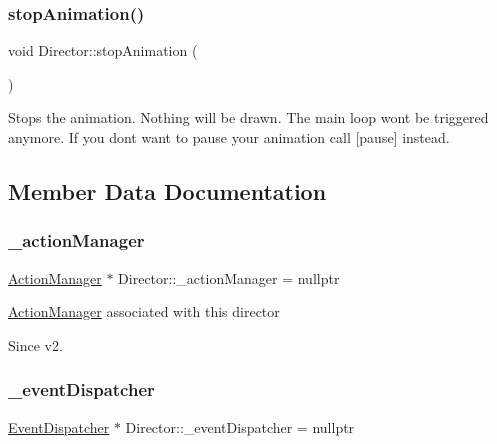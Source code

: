 \subsubsection{\texorpdfstring{stop\+Animation()}{stopAnimation()}\hspace{0.1cm}{\footnotesize\ttfamily [2/2]}}
{\footnotesize\ttfamily void Director\+::stop\+Animation (\begin{DoxyParamCaption}{ }\end{DoxyParamCaption})}

Stops the animation. Nothing will be drawn. The main loop won\textquotesingle{}t be triggered anymore. If you don\textquotesingle{}t want to pause your animation call \mbox{[}pause\mbox{]} instead. 

\subsection{Member Data Documentation}
\mbox{\label{classDirector_a0c57c42ef4fa57d55d6d6a5e2cf9d92a}} 
\subsubsection{\texorpdfstring{\+\_\+action\+Manager}{\_actionManager}}
{\footnotesize\ttfamily \hyperlink{classActionManager}{Action\+Manager} $\ast$ Director\+::\+\_\+action\+Manager = nullptr\hspace{0.3cm}{\ttfamily [protected]}}

\hyperlink{classActionManager}{Action\+Manager} associated with this director \begin{DoxySince}{Since}
v2. 
\end{DoxySince}
\mbox{\label{classDirector_a692fa8b03378f2c8f01133355fcaeb7b}} 
\subsubsection{\texorpdfstring{\+\_\+event\+Dispatcher}{\_eventDispatcher}}
{\footnotesize\ttfamily \hyperlink{classEventDispatcher}{Event\+Dispatcher} $\ast$ Director\+::\+\_\+event\+Dispatcher = nullptr\hspace{0.3cm}{\ttfamily [protected]}}

